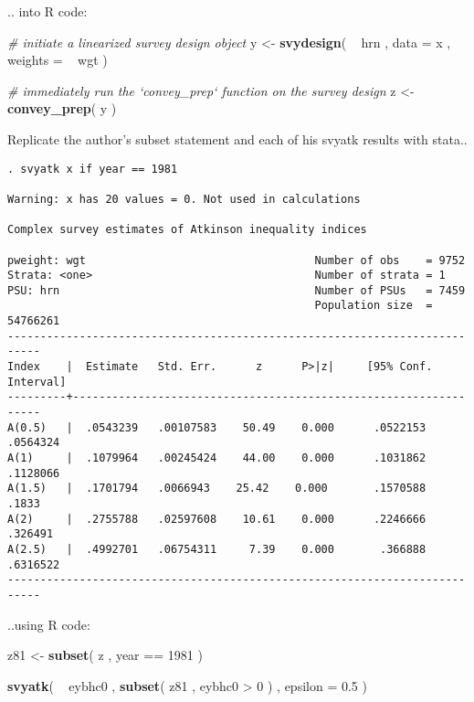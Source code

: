 \documentclass[]{book}
\newenvironment{Shaded}{\begin{snugshade}}{\end{snugshade}}
\newcommand{\KeywordTok}[1]{\textcolor[rgb]{0.13,0.29,0.53}{\textbf{{#1}}}}
\newcommand{\DataTypeTok}[1]{\textcolor[rgb]{0.13,0.29,0.53}{{#1}}}
\newcommand{\DecValTok}[1]{\textcolor[rgb]{0.00,0.00,0.81}{{#1}}}
\newcommand{\FloatTok}[1]{\textcolor[rgb]{0.00,0.00,0.81}{{#1}}}
\newcommand{\StringTok}[1]{\textcolor[rgb]{0.31,0.60,0.02}{{#1}}}
\newcommand{\CommentTok}[1]{\textcolor[rgb]{0.56,0.35,0.01}{\textit{{#1}}}}
\newcommand{\NormalTok}[1]{{#1}}
\begin{document}
.. into R code:

\begin{Shaded}
\begin{Highlighting}[]
\CommentTok{# initiate a linearized survey design object}
\NormalTok{y <-}\StringTok{ }\KeywordTok{svydesign}\NormalTok{( ~}\StringTok{ }\NormalTok{hrn , }\DataTypeTok{data =} \NormalTok{x , }\DataTypeTok{weights =} \NormalTok{~}\StringTok{ }\NormalTok{wgt )}

\CommentTok{# immediately run the `convey_prep` function on the survey design}
\NormalTok{z <-}\StringTok{ }\KeywordTok{convey_prep}\NormalTok{( y )}
\end{Highlighting}
\end{Shaded}

Replicate the author's subset statement and each of his svyatk results
with stata..

\begin{verbatim}
. svyatk x if year == 1981
 
Warning: x has 20 values = 0. Not used in calculations

Complex survey estimates of Atkinson inequality indices
 
pweight: wgt                                   Number of obs    = 9752
Strata: <one>                                  Number of strata = 1
PSU: hrn                                       Number of PSUs   = 7459
                                               Population size  = 54766261
---------------------------------------------------------------------------
Index    |  Estimate   Std. Err.      z      P>|z|     [95% Conf. Interval]
---------+-----------------------------------------------------------------
A(0.5)   |  .0543239   .00107583    50.49    0.000      .0522153   .0564324
A(1)     |  .1079964   .00245424    44.00    0.000      .1031862   .1128066
A(1.5)   |  .1701794   .0066943    25.42    0.000       .1570588      .1833
A(2)     |  .2755788   .02597608    10.61    0.000      .2246666    .326491
A(2.5)   |  .4992701   .06754311     7.39    0.000       .366888   .6316522
---------------------------------------------------------------------------
\end{verbatim}

..using R code:

\begin{Shaded}
\begin{Highlighting}[]
\NormalTok{z81 <-}\StringTok{ }\KeywordTok{subset}\NormalTok{( z , year ==}\StringTok{ }\DecValTok{1981} \NormalTok{)}

\KeywordTok{svyatk}\NormalTok{( ~}\StringTok{ }\NormalTok{eybhc0 , }\KeywordTok{subset}\NormalTok{( z81 , eybhc0 >}\StringTok{ }\DecValTok{0} \NormalTok{) , }\DataTypeTok{epsilon =} \FloatTok{0.5} \NormalTok{)}
\end{Highlighting}
\end{Shaded}
\end{document}
